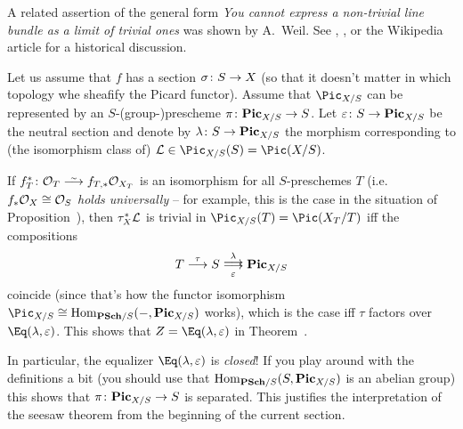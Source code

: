 \documentclass[a4paper,parskip=half,numbers=enddot, DIV=12]{scrreprt}
\begin{document}
\begin{rem}
	\begin{alphanumerate}
		\item {}A related assertion of the general form \emph{You cannot express a non-trivial line bundle as a limit of trivial ones} was shown by A.\ Weil. See \cite{cornell1986arithmetic}, \cite{mumford1974abelian}, or the Wikipedia article for a historical discussion.
		\item Let us assume that $f$ has a section $\sigma\colon S\morphism X$ (so that it doesn't matter in which topology whe sheafify the Picard functor). Assume that $\Pic_{X/S}$ can be represented by an $S$-(group-)prescheme $\pi\colon\PIC_{X/S}\morphism S$. Let $\epsilon\colon S\morphism\PIC_{X/S}$ be the neutral section and denote by $\lambda\colon S\morphism\PIC_{X/S}$ the morphism corresponding to (the isomorphism class of) $\Ll\in\Pic_{X/S}(S)=\Pic(X/S)$.
		
		If $f_T^*\colon \Oo_T\isomorphism f_{T,*}\Oo_{X_T}$ is an isomorphism for all $S$-preschemes $T$ (i.e.\ $f_*\mathcal{O}_X\cong \mathcal{O}_S$ \emph{holds universally} -- for example, this is the case in the situation of Proposition~), then $\tau_X^*\mathcal{L}$ is trivial in $\Pic_{X/S}(T)=\Pic(X_T/T)$ iff the compositions
		\begin{align*}
			T\morphism[\tau]S\doublemorphism[\lambda][\epsilon]\PIC_{X/S}
		\end{align*}
		coincide (since that's how the functor isomorphism $\Pic_{X/S}\cong \Hom_{\cat{PSch}/S}(-,\PIC_{X/S})$ works), which is the case iff $\tau$ factors over $\Eq(\lambda,\epsilon)$. This shows that $Z=\Eq(\lambda,\epsilon)$ in Theorem~.
		
		In particular, the equalizer $\Eq(\lambda,\epsilon)$ is \emph{closed}! If you play around with the definitions a bit (you should use that $\Hom_{\cat{PSch}/S}(S,\PIC_{X/S})$ is an abelian group) this shows that $\pi\colon \PIC_{X/S}\morphism S$ is separated. This justifies the interpretation of the seesaw theorem from the beginning of the current section.
	\end{alphanumerate}
\end{rem}
\end{document}
